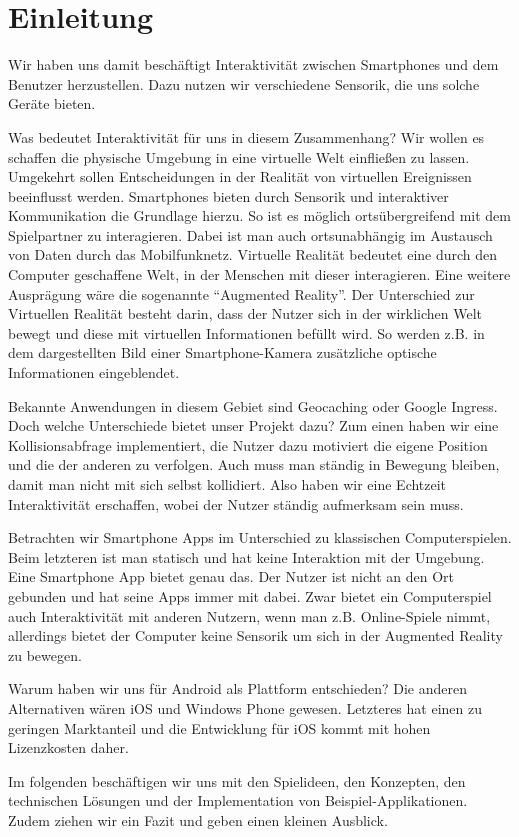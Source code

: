 \chapter{Einleitung}
Wir haben uns damit beschäftigt Interaktivität zwischen Smartphones und dem Benutzer herzustellen. Dazu nutzen wir verschiedene Sensorik, die uns solche Geräte bieten.

Was bedeutet Interaktivität für uns in diesem Zusammenhang? Wir wollen es schaffen die physische Umgebung in eine virtuelle Welt einfließen zu lassen. Umgekehrt sollen Entscheidungen in der Realität von virtuellen Ereignissen beeinflusst werden.
Smartphones bieten durch Sensorik und interaktiver Kommunikation die Grundlage hierzu. So ist es möglich ortsübergreifend mit dem Spielpartner zu interagieren. Dabei ist man auch ortsunabhängig im Austausch von Daten durch das Mobilfunknetz. 
Virtuelle Realität bedeutet eine durch den Computer geschaffene Welt, in der Menschen mit dieser interagieren.
Eine weitere Ausprägung wäre die sogenannte “Augmented Reality”. Der Unterschied zur Virtuellen Realität besteht darin, dass der Nutzer sich in der wirklichen Welt bewegt und diese mit virtuellen Informationen befüllt wird. So werden z.B. in dem dargestellten Bild einer Smartphone-Kamera zusätzliche optische Informationen eingeblendet.

Bekannte Anwendungen in diesem Gebiet sind Geocaching oder Google Ingress. Doch welche Unterschiede bietet unser Projekt dazu?
Zum einen haben wir eine Kollisionsabfrage implementiert, die Nutzer dazu motiviert die eigene Position und die der anderen zu verfolgen. Auch muss man ständig in Bewegung bleiben, damit man nicht mit sich selbst kollidiert. Also haben wir eine Echtzeit Interaktivität erschaffen, wobei der Nutzer ständig aufmerksam sein muss. 

Betrachten wir Smartphone Apps im Unterschied zu klassischen Computerspielen. Beim letzteren ist man statisch und hat keine Interaktion mit der Umgebung. Eine Smartphone App bietet genau das. Der Nutzer ist nicht an den Ort gebunden und hat seine Apps immer mit dabei. 
Zwar bietet ein Computerspiel auch Interaktivität mit anderen Nutzern, wenn man z.B. Online-Spiele nimmt, allerdings bietet der Computer keine Sensorik um sich in der Augmented Reality zu bewegen.

Warum haben wir uns für Android als Plattform entschieden? Die anderen Alternativen wären iOS und Windows Phone gewesen. Letzteres hat einen zu geringen Marktanteil \cite{xmpp} und die Entwicklung für iOS kommt mit hohen Lizenzkosten daher.  

Im folgenden beschäftigen wir uns mit den Spielideen, den Konzepten, den technischen Lösungen und der Implementation von Beispiel-Applikationen. Zudem ziehen wir ein Fazit und geben einen kleinen Ausblick.

\newpage
